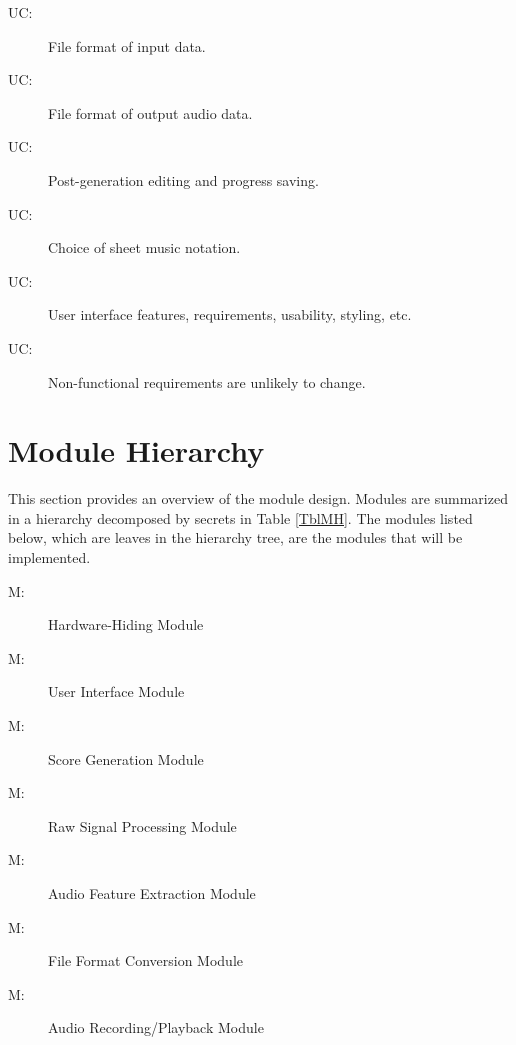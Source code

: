 \documentclass[12pt, titlepage]{article}
\newcounter{ucnum}
\newcommand{\uctheucnum}{UC\theucnum}
\newcounter{mnum}
\newcommand{\mthemnum}{M\themnum}
\begin{document}
\begin{description}
  \item[ \uctheucnum \label{ucInputFormat}:] File format of input data.
  \item[ \uctheucnum \label{ucOutputFormat}:] File format of output audio data.
  \item[ \uctheucnum \label{ucEditing}:] Post-generation editing and progress saving.
  \item[ \uctheucnum \label{ucNotation}:] Choice of sheet music notation.
  \item[ \uctheucnum \label{ucUI}:] User interface features, requirements, usability, styling, etc.
  \item[ \uctheucnum \label{nfrStability}:] Non-functional requirements are unlikely to change.
\end{description}

\section{Module Hierarchy} \label{SecMH}

This section provides an overview of the module design. Modules are summarized
in a hierarchy decomposed by secrets in Table \ref{TblMH}. The modules listed
below, which are leaves in the hierarchy tree, are the modules that will
be implemented.

\begin{description}
\item [ \mthemnum \label{mHH}:] Hardware-Hiding Module
\item [ \mthemnum \label{mUI}:] User Interface Module
\item [ \mthemnum \label{mSG}:] Score Generation Module
\item [ \mthemnum \label{mRSM}:] Raw Signal Processing Module
\item [ \mthemnum \label{mAFE}:] Audio Feature Extraction Module
\item [ \mthemnum \label{mFFC}:] File Format Conversion Module
\item [ \mthemnum \label{mARP}:] Audio Recording/Playback Module
\end{description}
\end{document}
